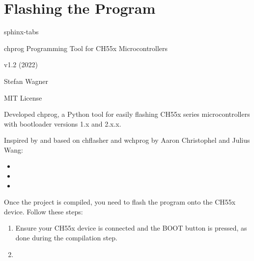 \documentclass[letterpaper,10pt,english]{sphinxmanual}
\begin{document}
\section{Flashing the Program}
\label{\detokenize{compile:flashing-the-program}}
\begin{sphinxuseclass}{sphinx-tabs}
\sphinxAtStartPar
{}

\sphinxAtStartPar
{} chprog \sphinxhyphen{} Programming Tool for CH55x Microcontrollers

\sphinxAtStartPar
{} v1.2 (2022)

\sphinxAtStartPar
{} Stefan Wagner

\sphinxAtStartPar
{} 

\sphinxAtStartPar
{} MIT License

\sphinxAtStartPar
{}
Developed chprog, a Python tool for easily flashing CH55x series microcontrollers with bootloader versions 1.x and 2.x.x.

\sphinxAtStartPar
{}
Inspired by and based on chflasher and wchprog by Aaron Christophel and Julius Wang:
\begin{itemize}
\item {} 
\sphinxAtStartPar
{}

\item {} 
\sphinxAtStartPar
{}

\item {} 
\sphinxAtStartPar
{}

\end{itemize}

\sphinxAtStartPar
Once the project is compiled, you need to flash the program onto the CH55x device. Follow these steps:
\begin{enumerate}
%
\item {} 
\sphinxAtStartPar
{}

\sphinxAtStartPar
Ensure your CH55x device is connected and the BOOT button is pressed, as done during the compilation step.

\item {} 
\sphinxAtStartPar
{}


\end{enumerate}
\end{sphinxuseclass}
\end{document}
